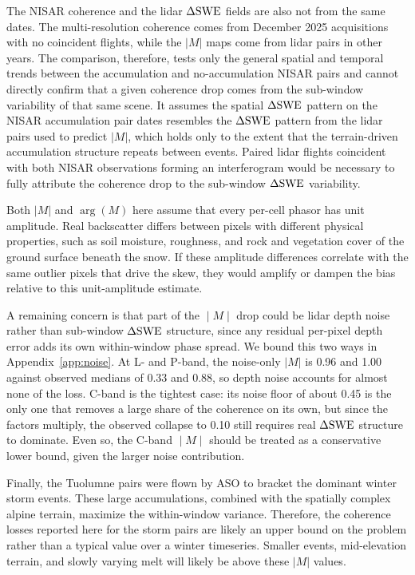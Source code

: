 \documentclass[journal abbreviation, manuscript]{copernicus}
\begin{document}
The NISAR coherence and the lidar $\Delta\mathrm{SWE}$ fields are also not from the same dates. The multi-resolution coherence comes from December 2025 acquisitions with no coincident flights, while the $|M|$ maps come from lidar pairs in other years. The comparison, therefore, tests only the general spatial and temporal trends between the accumulation and no-accumulation NISAR pairs and cannot directly confirm that a given coherence drop comes from the sub-window variability of that same scene. It assumes the spatial $\Delta\mathrm{SWE}$ pattern on the NISAR accumulation pair dates resembles the $\Delta\mathrm{SWE}$ pattern from the lidar pairs used to predict $|M|$, which holds only to the extent that the terrain-driven accumulation structure repeats between events. Paired lidar flights coincident with both NISAR observations forming an interferogram would be necessary to fully attribute the coherence drop to the sub-window $\Delta\mathrm{SWE}$ variability.

Both $|M|$ and $\arg(M)$ here assume that every per-cell phasor has unit amplitude. Real backscatter differs between pixels with different physical properties, such as soil moisture, roughness, and rock and vegetation cover of the ground surface beneath the snow. If these amplitude differences correlate with the same outlier pixels that drive the skew, they would amplify or dampen the bias relative to this unit-amplitude estimate.

A remaining concern is that part of the $∣M∣$ drop could be lidar depth noise rather than sub-window $\Delta\mathrm{SWE}$ structure, since any residual per-pixel depth error adds its own within-window phase spread. We bound this two ways in Appendix~\ref{app:noise}. At L- and P-band, the noise-only $|M|$ is 0.96 and 1.00 against observed medians of 0.33 and 0.88, so depth noise accounts for almost none of the loss. C-band is the tightest case: its noise floor of about 0.45 is the only one that removes a large share of the coherence on its own, but since the factors multiply, the observed collapse to 0.10 still requires real $\Delta\mathrm{SWE}$ structure to dominate. Even so, the C-band $∣M∣$ should be treated as a conservative lower bound, given the larger noise contribution.

Finally, the Tuolumne pairs were flown by ASO to bracket the dominant winter storm events. These large accumulations, combined with the spatially complex alpine terrain, maximize the within-window variance. Therefore, the coherence losses reported here for the storm pairs are likely an upper bound on the problem rather than a typical value over a winter timeseries. Smaller events, mid-elevation terrain, and slowly varying melt will likely be above these $|M|$ values.
\end{document}
